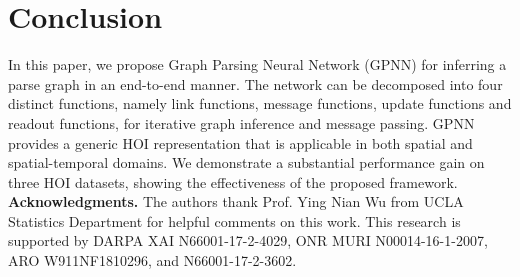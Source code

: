 \documentclass[runningheads]{llncs}
\begin{document}
\section{Conclusion}
In this paper, we propose Graph Parsing Neural Network (GPNN) for inferring a parse graph in an end-to-end manner. The network can be decomposed into four distinct functions, namely link functions, message functions, update functions and readout functions, for iterative graph inference and message passing. GPNN provides a generic HOI representation that is applicable in both spatial and spatial-temporal domains. We demonstrate a substantial performance gain on three HOI datasets, showing the effectiveness of the proposed framework.\\



\noindent\textbf{Acknowledgments.}
The authors thank Prof. Ying Nian Wu from UCLA Statistics Department for helpful comments on this work.
This research is supported by DARPA XAI N66001-17-2-4029, ONR MURI N00014-16-1-2007, ARO W911NF1810296, and N66001-17-2-3602.

{\small


}
\end{document}
